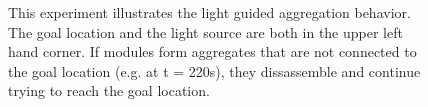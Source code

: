 \begin{figure}[h]
\begin{subfigure}[b]{0.32\linewidth}
	\end{subfigure}
	
	\caption{This experiment illustrates the light guided aggregation behavior. The goal location and the light source are both in the upper left hand corner. If modules form aggregates that are not connected to the goal location (e.g. at t = 220s), they dissassemble and continue trying to reach the goal location.}
	
	\label{fig:LightExperiment}
\end{figure}
